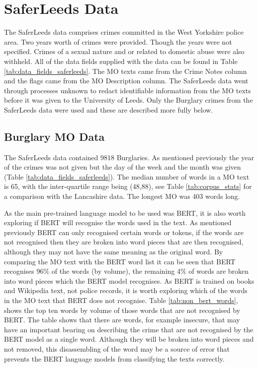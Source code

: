 \section{SaferLeeds Data} The SaferLeeds data comprises crimes committed in the West Yorkshire police area. Two years worth of crimes were provided. Though the years were not specified. Crimes of a sexual nature and or related to domestic abuse were also withheld. All of the data fields supplied with the data can be found in Table \ref{tab:data_fields_saferleeds}. The MO texts came from the Crime Notes column and the flags came from the MO Description column. The SaferLeeds data went through processes unknown to redact identifiable information from the MO texts before it was given to the University of Leeds. Only the Burglary crimes from the SaferLeeds data were used and these are described more fully below.

\subsection{Burglary MO Data} The SaferLeeds data contained 9818 Burglaries. As mentioned previously the year of the crimes was not given but the day of the week and the month was given (Table \ref{tab:data_fields_saferleeds}). The median number of words in a MO text is 65, with the inter-quartile range being (48,88), see Table \ref{tab:corpus_stats} for a comparison with the Lancashire data. The longest MO was 403 words long.


As the main pre-trained language model to be used was BERT, it is also worth exploring if BERT will recognise the words used in the text. As mentioned previously BERT can only recognised certain words or tokens, if the words are not recognised then they are broken into word pieces that are then recognised, although they may not have the same meaning as the original word. By comparing the MO text with the BERT word list it can be seen that BERT recognises 96\% of the words  (by volume), the remaining 4\% of words are broken into word pieces which the BERT model recognises. As BERT is trained on books and Wikipedia text, not police records, it is worth exploring which of the words in the MO text that BERT does not recognise. Table \ref{tab:non_bert_words}, shows the top ten words by volume of those words that are not recognised by BERT. The table shows that there are words, for example insecure, that may have an important bearing on describing the crime that are not recognised by the BERT model as a single word. Although they will be broken into word pieces and not removed, this disassembling of the word  may be a source of error that prevents the BERT language models from classifying the texts correctly.

